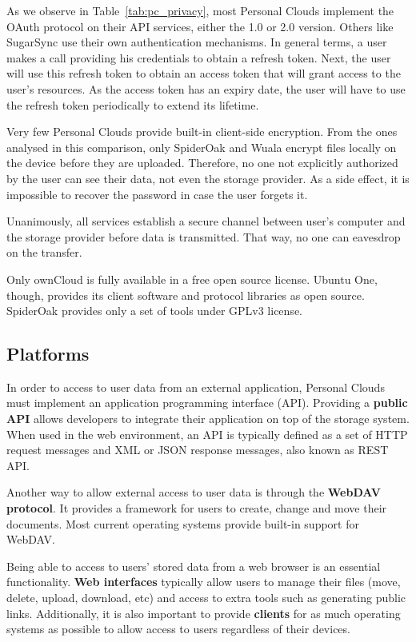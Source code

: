 As we observe in Table~\ref{tab:pc_privacy}, most Personal Clouds implement the OAuth protocol on their API services, either the 1.0 or 2.0 version. Others like SugarSync use their own authentication mechanisms. In general terms, a user makes a call providing his credentials to obtain a refresh token. Next, the user will use this refresh token to obtain an access token that will grant access to the user's resources. As the access token has an expiry date, the user will have to use the refresh token periodically to extend its lifetime.

Very few Personal Clouds provide built-in client-side encryption. From the ones analysed in this comparison, only SpiderOak and Wuala encrypt files locally on the device before they are uploaded. Therefore, no one not explicitly authorized by the user can see their data, not even the storage provider. As a side effect, it is impossible to recover the password in case the user forgets it.

Unanimously, all services establish a secure channel between user's computer and the storage provider before data is transmitted. That way, no one can eavesdrop on the transfer.

Only ownCloud is fully available in a free open source license. Ubuntu One, though, provides its client software and protocol libraries as open source. SpiderOak provides only a set of tools under GPLv3 license.



\subsection{Platforms}


In order to access to user data from an external application, Personal Clouds must implement an application programming interface (API). Providing a \textbf{public API} allows developers to integrate their application on top of the storage system. When used in the web environment, an API is typically defined as a set of HTTP request messages and XML or JSON response messages, also known as REST API.

Another way to allow external access to user data is through the \textbf{WebDAV protocol}. It provides a framework for users to create, change and move their documents. Most current operating systems provide built-in support for WebDAV.

Being able to access to users' stored data from a web browser is an essential functionality. \textbf{Web interfaces} typically allow users to manage their files (move, delete, upload, download, etc) and access to extra tools such as generating public links. Additionally, it is also important to provide \textbf{clients} for as much operating systems as possible to allow access to users regardless of their devices.


